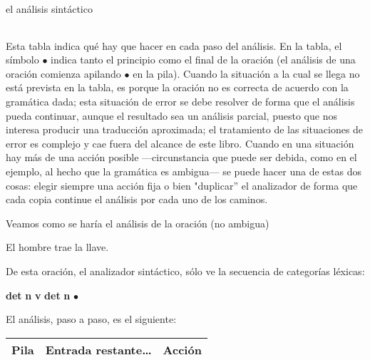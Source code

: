 \begin{persabermes}{el análisis sintáctico}
\begin{center}
\begin{tabular}{l|l|l}
\end{tabular} \end{center} 

Esta tabla indica qué hay que hacer en cada paso del análisis. En la tabla, el símbolo $\bullet$ indica tanto el principio como el final de la oración (el análisis de una oración comienza apilando $\bullet$ en la pila). Cuando la situación a la cual se llega no está prevista en la tabla, es porque la oración no es correcta de acuerdo con la gramática dada; esta situación de error se debe resolver de forma que el análisis pueda continuar, aunque el resultado sea un análisis parcial, puesto que nos interesa producir una traducción aproximada; el tratamiento de las situaciones de error es complejo y cae fuera del alcance de este libro. Cuando en una situación hay más de una acción posible ---circunstancia que puede ser debida, como en el ejemplo, al hecho que la gramática es ambigua--- se puede hacer una de estas dos cosas: elegir siempre una acción fija o bien "duplicar'' el analizador de forma que cada copia continue el análisis por cada uno de los caminos. 

Veamos como se haría el análisis de la oración (no ambigua) \begin{example} El hombre trae la llave. \end{example} De esta oración, el analizador sintáctico, sólo ve la secuencia de categorías léxicas: \begin{example} \textbf{det} \textbf{n} \textbf{v} \textbf{det} \textbf{n} \mbox{$\bullet$} \end{example} El análisis, paso a paso, es el siguiente: \begin{center} \begin{tabular}{l|r|l} \hline

Pila &Entrada restante\ldots &Acción \\ \hline


\end{tabular}
\end{center}
\end{persabermes}
